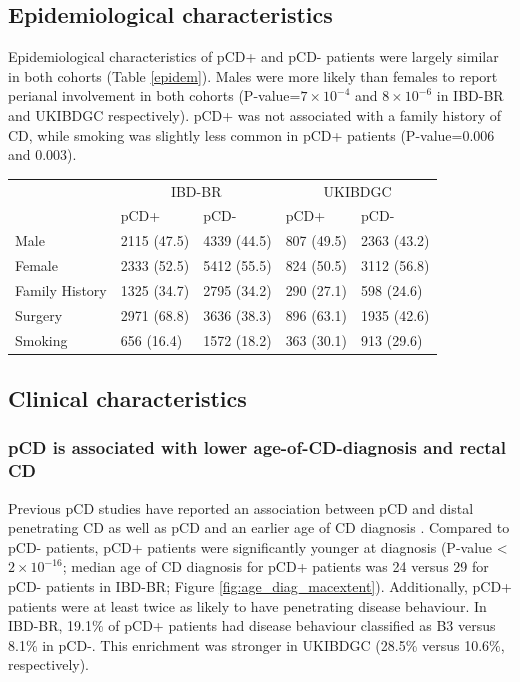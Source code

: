 \subsection{Epidemiological characteristics}
Epidemiological characteristics of pCD+ and pCD- patients were largely similar in both cohorts (Table \ref{epidem}). Males were more likely than females to report perianal involvement in both cohorts (P-value={$7\times10^{-4}$} and {$8\times10^{-6}$} in IBD-BR and UKIBDGC respectively). pCD+ was not associated with a family history of CD, while smoking was slightly less common in pCD+ patients (P-value=0.006 and 0.003).
\setlength{\tabcolsep}{10pt} 
\renewcommand{\arraystretch}{1.5}
\begin{table}[htb]
  \centering
  \begin{tabular}[t]{lllll}
  \toprule
  \multicolumn{1}{c}{ } & \multicolumn{2}{c}{IBD-BR} & \multicolumn{2}{c}{UKIBDGC} \\
  \cmidrule(l{3pt}r{3pt}){2-3} \cmidrule(l{3pt}r{3pt}){4-5}
   & pCD+ & pCD- & pCD+ & pCD-\\
  \midrule
  Male & 2115 (47.5) & 4339 (44.5) & 807 (49.5) & 2363 (43.2)\\
  Female & 2333 (52.5) & 5412 (55.5) & 824 (50.5) & 3112 (56.8)\\
  Family History & 1325 (34.7) & 2795 (34.2) & 290 (27.1) & 598 (24.6)\\
  Surgery & 2971 (68.8) & 3636 (38.3) & 896 (63.1) & 1935 (42.6)\\
  Smoking & 656 (16.4) & 1572 (18.2) & 363 (30.1) & 913 (29.6)\\
  \bottomrule
  \end{tabular}
  \end{table}
  \label{epidem}


  \subsection{Clinical characteristics}
\subsubsection{pCD is associated with lower age-of-CD-diagnosis and rectal CD}

Previous pCD studies have reported an association between pCD and distal penetrating CD as well as pCD and an earlier age of CD diagnosis \cite{Duricova2014-gf,Kaur2016-bs}. Compared to pCD- patients, pCD+ patients were significantly younger at diagnosis (P-value < $2\times10^{-16}$; median age of CD diagnosis for pCD+ patients was 24 versus 29 for pCD- patients in IBD-BR; Figure \ref{fig:age_diag_macextent}). Additionally, pCD+ patients were at least twice as likely to have penetrating disease behaviour. In IBD-BR, 19.1\% of pCD+ patients had disease behaviour classified as B3 versus 8.1\% in pCD-. This enrichment was stronger in UKIBDGC (28.5\% versus 10.6\%, respectively). \\

